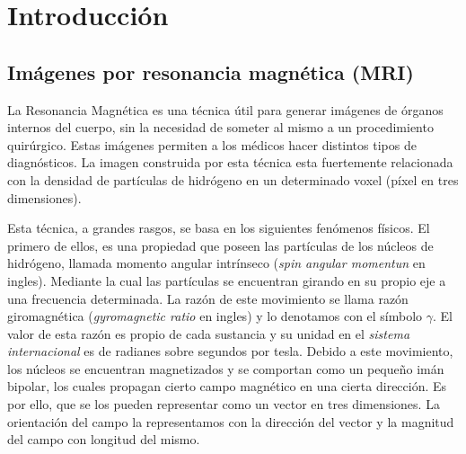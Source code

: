 
\chapter{Introducci\'on}

\section{Imágenes por resonancia magnética (MRI)}




La Resonancia Magn\'etica es una t\'ecnica útil para generar im\'agenes de 
\'organos internos del cuerpo, sin la necesidad de someter al mismo a un 
procedimiento quir\'urgico. Estas im\'agenes permiten a los m\'edicos hacer distintos tipos de 
diagn\'osticos. La imagen construida por esta t\'ecnica esta fuertemente 
relacionada con la densidad de part\'iculas de hidr\'ogeno en un determinado 
voxel (p\'ixel en tres dimensiones).

Esta t\'ecnica, a grandes rasgos, se basa en los siguientes fen\'omenos f\'isicos. El primero de 
ellos, es 
una propiedad que poseen las part\'iculas de los n\'ucleos de hidr\'ogeno, 
llamada momento angular intrínseco (\textit{spin angular momentun} en ingles). 
Mediante la cual las part\'iculas se encuentran girando en su 
propio eje a una frecuencia determinada. La razón de este movimiento se llama razón 
giromagnética (\textit{gyromagnetic 
ratio} en ingles) y lo denotamos con el símbolo $\gamma$. El valor de esta 
razón es propio de cada sustancia y su unidad en el 
\textit{sistema internacional} es de radianes sobre segundos por tesla. Debido 
a este movimiento, los n\'ucleos se encuentran 
magnetizados y se comportan como un peque\~no im\'an bipolar, los cuales 
propagan cierto campo magn\'etico en una cierta direcci\'on. Es por ello, que se los pueden 
representar como un vector en tres dimensiones. La orientaci\'on del campo la representamos con 
la direcci\'on del vector y la magnitud del campo con longitud del mismo.

